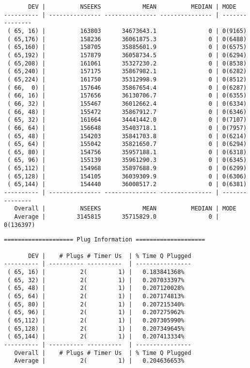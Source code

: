 \begin{verbatim}
       DEV |          NSEEKS            MEAN          MEDIAN | MODE           
---------- | --------------- --------------- --------------- | ---------------
 ( 65, 16) |          163803      34673643.1               0 | 0(9165)
 ( 65,176) |          158236      36061875.3               0 | 0(6488)
 ( 65,160) |          158705      35885601.9               0 | 0(6575)
 ( 65,192) |          157879      36058734.5               0 | 0(6294)
 ( 65,208) |          161061      35327230.2               0 | 0(8538)
 ( 65,240) |          157175      35867982.1               0 | 0(6282)
 ( 65,224) |          161750      35312998.9               0 | 0(8512)
 ( 66,  0) |          157646      35867654.4               0 | 0(6287)
 ( 66, 16) |          157656      36130706.7               0 | 0(6355)
 ( 66, 32) |          155467      36012662.4               0 | 0(6334)
 ( 66, 48) |          155472      35867912.7               0 | 0(6346)
 ( 65, 32) |          161664      34441442.0               0 | 0(7107)
 ( 66, 64) |          156648      35403718.1               0 | 0(7957)
 ( 65, 48) |          154203      35841703.8               0 | 0(6214)
 ( 65, 64) |          155042      35821650.7               0 | 0(6294)
 ( 65, 80) |          154756      35957188.1               0 | 0(6318)
 ( 65, 96) |          155139      35961290.3               0 | 0(6345)
 ( 65,112) |          154968      35897688.9               0 | 0(6299)
 ( 65,128) |          154105      36039309.9               0 | 0(6306)
 ( 65,144) |          154440      36008517.2               0 | 0(6381)
---------- | --------------- --------------- --------------- | ---------------
   Overall |          NSEEKS            MEAN          MEDIAN | MODE           
   Average |         3145815      35715829.0               0 | 0(136397)
\end{verbatim}\newpage\begin{verbatim}
==================== Plug Information ====================

       DEV |    # Plugs # Timer Us  | % Time Q Plugged
---------- | ---------- ----------  | ----------------
 ( 65, 16) |          2(         1) |   0.183841368%
 ( 65, 32) |          2(         1) |   0.207033397%
 ( 65, 48) |          2(         1) |   0.207120028%
 ( 65, 64) |          2(         1) |   0.207174813%
 ( 65, 80) |          2(         1) |   0.207215340%
 ( 65, 96) |          2(         1) |   0.207275962%
 ( 65,112) |          2(         1) |   0.207305990%
 ( 65,128) |          2(         1) |   0.207349645%
 ( 65,144) |          2(         1) |   0.207413334%
---------- | ---------- ----------  | ----------------
   Overall |    # Plugs # Timer Us  | % Time Q Plugged
   Average |          2(         1) |   0.204636653%
\end{verbatim}
